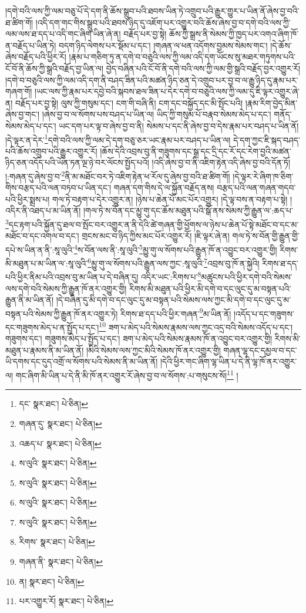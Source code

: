 །དགེ་བའི་ལས་ཀྱི་ལམ་བཅུ་པོ་དེ་དག་ནི་ཆོས་སྒྲུབ་པའི་ཐབས་ཡིན་ཏེ་འགྲུབ་པའི་རྒྱུར་གྱུར་པ་ཡིན་ནོ་ཞེས་བྱ་བའི་ཐ་ཚིག་གོ། །འདི་དག་གང་གིས་སྒྲུབ་པའི་ཐབས་ཉིད་དུ་འཇོག་པར་འགྱུར་བའི་ཆོས་ཞེས་བྱ་བ་དགེ་བའི་ལས་ཀྱི་ལམ་ལས་ཐ་དད་པ་འདི་གང་ཞིག་ཡིན་ཞེ་ན། བརྗོད་པར་བྱ་སྟེ། ཆོས་ཀྱི་སྒྲས་ནི་སེམས་ཀྱི་ཁྱད་པར་འགའ་ཞིག་ཁོ་ན་བརྗོད་པ་ཡིན་ཏེ། བདག་ཉིད་ལེགས་པར་སྡོམ་པ་དང་། །གཞན་ལ་ཕན་འདོགས་བྱམས་སེམས་གང་། །དེ་ཆོས་ཞེས་བརྗོད་པའི་ཕྱིར་རོ། །རྣམ་པ་གཅིག་ཏུ་ན་དགེ་བ་བཅུའི་ལས་ཀྱི་ལམ་འདི་དག་ཡོངས་སུ་མཐར་གཏུགས་པའི་ངོ་བོ་ནི་ཆོས་ཀྱི་སྒྲའི་བརྗོད་བྱ་ཡིན་ལ། བྱེད་བཞིན་པའི་ངོ་བོ་ནི་དགེ་བའི་ལས་ཀྱི་ལམ་གྱི་སྒྲའི་བརྗོད་བྱར་འགྱུར་རོ། །དགེ་བ་བཅུའི་ལས་ཀྱི་ལམ་འདི་དག་ནི་བཤད་ཟིན་པའི་མཚན་ཉིད་ཅན་དེ་འགྲུབ་པར་བྱ་བ་ལ་རྒྱུ་ཉིད་དུ་རྣམ་པར་གཞག་གོ། །ཡང་ལས་ཀྱི་རྣམ་པར་དབྱེ་བའི་སྐབས་ཐལ་ཟིན་པ་དེར་དགེ་བ་བཅུའི་ལས་ཀྱི་ལམ་དུ་ཇི་ལྟར་འགྱུར་ཞེ་ན། བརྗོད་པར་བྱ་སྟེ། ལུས་ཀྱི་གསུམ་དང་། ངག་གི་བཞི་ནི། ངག་དང་བསྐྱོད་དང་མི་སྤོང་པའི། །རྣམ་རིག་བྱེད་མིན་ཞེས་བྱ་གང་། །ཞེས་བྱ་བ་ལ་སོགས་པས་བཤད་པ་ཡིན་ལ། ཡིད་ཀྱི་གསུམ་པོ་བརྣབ་སེམས་མེད་པ་དང་། གནོད་སེམས་མེད་པ་དང་། ཡང་དག་པར་ལྟ་བ་ཞེས་བྱ་བ་ནི། སེམས་པ་དང་ནི་ཞེས་བྱ་བ་དེས་རྣམ་པར་བཤད་པ་ཡིན་ནོ། །དེ་ལྟར་ན་དེར་\footnote{དང་  སྣར་ཐང་།  པེ་ཅིན། }དགེ་བའི་ལས་ཀྱི་ལམ་དེ་དག་བཅུ་ཅར་ཡང་རྣམ་པར་བཤད་པ་ཡིན་ལ། དེ་དག་ཀྱང་ཇི་སྐད་བཤད་པའི་ཆོས་འགྲུབ་པའི་རྒྱུར་འགྱུར་རོ། །ཆོས་དེའི་འབྲས་བུ་ནི་གཟུགས་དང་སྒྲ་དང་དྲི་དང་རོ་དང་རེག་བྱའི་མཚན་ཉིད་ཅན་འདོད་པའི་ཡོན་ཏན་ལྔ་ཉེ་བར་ལོངས་སྤྱོད་པའོ། །འདི་ཞེས་བྱ་བ་ནི་འཇིག་རྟེན་འདི་ཞེས་བྱ་བའི་དོན་ཏོ། །:གཞན་དུ་ཞེས་བྱ་བ་\footnote{གཞན་དུ་  སྣར་ཐང་།  པེ་ཅིན། }ནི་མ་མཐོང་བར་ཏེ་འཇིག་རྟེན་ཕ་རོལ་དུ་ཞེས་བྱ་བའི་ཐ་ཚིག་གོ། །དེ་ལྟར་རེ་ཞིག་ཁ་ཅིག་གིས་བརྩད་པའི་ལན་བཏབ་པ་ཡིན་དང་། གཞན་དག་གིས་དེ་ལ་སྐྱོན་བརྗོད་ནས། བརྩད་པའི་ལན་གཞན་གདབ་པའི་ཕྱིར་སྨྲས་པ། གལ་ཏེ་བརྟག་པ་དེར་འགྱུར་ན། །ཉེས་པ་ཆེན་པོ་མང་པོར་འགྱུར། །དེ་ལྟ་བས་ན་བརྟག་པ་སྟེ། །འདིར་ནི་འཐད་པ་མ་ཡིན་ནོ། །གལ་ཏེ་ས་བོན་དང་མྱུ་གུ་དང་ཆོས་མཐུན་པའི་སྒོ་ནས་སེམས་ཀྱི་རྒྱུན་ལ་:ཆད་པ་\footnote{འཆད་པ་  སྣར་ཐང་།  པེ་ཅིན། }དང་རྟག་པའི་སྐྱོན་དུ་ཐལ་བ་སྤོང་བར་འགྱུར་ན་ནི་དེའི་ཚེ་གཞན་གྱི་ཕྱོགས་ལ་ཉེས་པ་ཆེན་པོ་སྟེ་མཐོང་བ་དང་མ་མཐོང་བ་དང་འགལ་བ་དང་། གྲངས་མང་བ་ཉིད་ཀྱིས་མང་པོར་འགྱུར་རོ། །ཇི་ལྟར་ཞེ་ན། གལ་ཏེ་ས་བོན་གྱི་རྒྱུན་གྱི་དཔེ་ས་ཡིན་ན་ནི་:སཱ་ལུའི་\footnote{ས་ལུའི་  སྣར་ཐང་།  པེ་ཅིན། }ས་བོན་ལས་ནི་:སཱ་ལུའི་\footnote{ས་ལུའི་  སྣར་ཐང་།  པེ་ཅིན། }མྱུ་གུ་ལ་སོགས་པའི་རྒྱུན་ཁོ་ན་འབྱུང་བར་འགྱུར་གྱི། རིགས་མི་མཐུན་པ་མ་ཡིན་ལ་:སཱ་ལུའི་\footnote{ས་ལུའི་  སྣར་ཐང་།  པེ་ཅིན། }མྱུ་གུ་ལ་སོགས་པའི་རྒྱུན་ལས་ཀྱང་:སཱ་ལུའི་\footnote{ས་ལུའི་  སྣར་ཐང་།  པེ་ཅིན། }འབྲས་བུ་ཁོ་ན་སྐྱེའི། རིགས་ཐ་དད་པའི་ཕྱིར་ནིམ་པའི་འབྲས་བུ་མ་ཡིན་པ་དེ་བཞིན་དུ། འདིར་ཡང་:རིགས་པ་\footnote{རིགས་  སྣར་ཐང་།  པེ་ཅིན། }མཚུངས་པའི་ཕྱིར་དགེ་བའི་སེམས་ལས་དགེ་བའི་སེམས་ཀྱི་རྒྱུན་ཁོ་ནར་འགྱུར་གྱི། རིགས་མི་མཐུན་པའི་ཕྱིར་མི་དགེ་བ་དང་ལུང་དུ་མ་བསྟན་པའི་རྒྱུན་ནི་མ་ཡིན་ནོ། །དེ་བཞིན་དུ་མི་དགེ་བ་དང་ལུང་དུ་མ་བསྟན་པའི་སེམས་ལས་ཀྱང་མི་དགེ་བ་དང་ལུང་དུ་མ་བསྟན་པའི་སེམས་ཀྱི་རྒྱུན་ཁོ་ནར་འགྱུར་ཏེ། རིགས་ཐ་དད་པའི་ཕྱིར་གཞན་\footnote{གཞན་ནི་  སྣར་ཐང་།  པེ་ཅིན། }མ་ཡིན་ནོ། །འདོད་པ་དང་གཟུགས་དང་གཟུགས་མེད་པ་ན་སྤྱོད་པ་དང་།\footnote{ན།  སྣར་ཐང་།  པེ་ཅིན། } ཟག་པ་མེད་པའི་སེམས་རྣམས་ལས་ཀྱང་འདྲ་བའི་སེམས་འདོད་པ་དང་། གཟུགས་དང་། གཟུགས་མེད་པ་སྤྱོད་པ་དང་། ཟག་པ་མེད་པའི་སེམས་རྣམས་ཁོ་ན་འབྱུང་བར་འགྱུར་གྱི། རིགས་མི་མཐུན་པ་རྣམས་ནི་མ་ཡིན་ནོ། །མིའི་སེམས་ལས་ཀྱང་མིའི་སེམས་ཁོ་ནར་འགྱུར་གྱི། གཞན་ལྷ་དང་དམྱལ་བ་དང་ཡི་དགས་དང་དུད་འགྲོ་ལ་སོགས་པའི་སེམས་ནི་མ་ཡིན་ནོ། །དེའི་ཕྱིར་གང་ཞིག་ལྷ་ཡིན་པ་དེ་ནི་ལྷ་ཁོ་ནར་འགྱུར་ལ། གང་ཞིག་མི་ཡིན་པ་དེ་ནི་མི་ཁོ་ནར་འགྱུར་རོ་ཞེས་བྱ་བ་ལ་སོགས་:པ་གསུངས་སོ།\footnote{པར་འགྱུར་རོ།  སྣར་ཐང་།  པེ་ཅིན། } །
